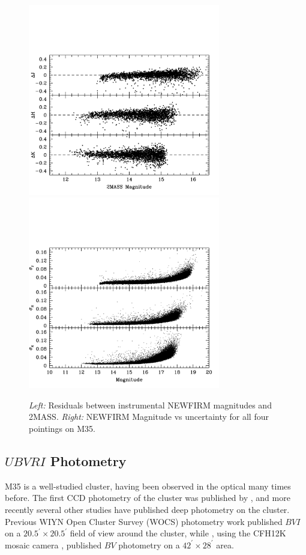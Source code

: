 \documentclass[iop]{emulateapj}
\begin{document}
\begin{figure} \centering
\includegraphics[trim = 0mm 20mm 20mm 200mm, clip, width=3.3in]{fig2_a.png}		%
\includegraphics[trim = 0mm 20mm 20mm 200mm, clip, width=3.3in]{fig2_b.png}		%
\caption{\emph{Left:} Residuals between instrumental NEWFIRM magnitudes and 2MASS. \emph{Right:} NEWFIRM Magnitude vs uncertainty for all four pointings on M35.\label{fig:NFMphotometry}}
\end{figure}

\subsection{$UBVRI$ Photometry}
M35 is a well-studied cluster, having been observed in the optical many times before. The first CCD photometry of the cluster was published by \citet{1999MNRAS.306..361S}, and more recently several other studies \citep{2002AJ....124.1555V, 2003AJ....126.1402K, 2000AAS...196.4206S} have published deep photometry on the cluster. Previous WIYN Open Cluster Survey (WOCS) photometry work \citep{2002AJ....124.1555V} published $BVI$ on a $20.5^\prime \times 20.5^\prime$ field of view around the cluster, while \citet{2003AJ....126.1402K}, using the CFH12K mosaic camera \citep{2001ASPC..232..398C}, published $BV$ photometry on a $42^\prime \times 28^\prime$ area.
\end{document}
